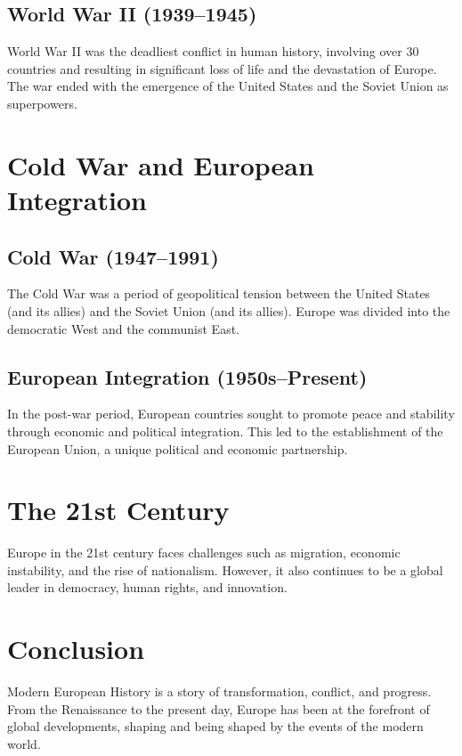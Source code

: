 \documentclass[a4paper,12pt]{book}
\begin{document}
\subsection{World War II (1939–1945)}
World War II was the deadliest conflict in human history, involving over 30 countries and resulting in significant loss of life and the devastation of Europe. The war ended with the emergence of the United States and the Soviet Union as superpowers.

\section{Cold War and European Integration}
\label{sec:cold-war-european-integration}
\subsection{Cold War (1947–1991)}
The Cold War was a period of geopolitical tension between the United States (and its allies) and the Soviet Union (and its allies). Europe was divided into the democratic West and the communist East.

\subsection{European Integration (1950s–Present)}
In the post-war period, European countries sought to promote peace and stability through economic and political integration. This led to the establishment of the European Union, a unique political and economic partnership.

\section{The 21st Century}
\label{sec:21st-century-europe}
Europe in the 21st century faces challenges such as migration, economic instability, and the rise of nationalism. However, it also continues to be a global leader in democracy, human rights, and innovation.

\section{Conclusion}
\label{sec:conclusion-modern-europe}
Modern European History is a story of transformation, conflict, and progress. From the Renaissance to the present day, Europe has been at the forefront of global developments, shaping and being shaped by the events of the modern world.
\end{document}
